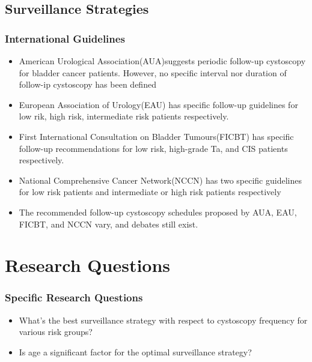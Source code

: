 \documentclass{beamer}
\begin{document}
\subsection{Surveillance Strategies}
\frame
{
\frametitle{International Guidelines }
  \begin{itemize}
  \item {American Urological Association(AUA)suggests periodic follow-up cystoscopy for bladder cancer patients. However, no specific interval nor duration of follow-ip cystoscopy has been defined}
  \item {European Association of Urology(EAU) has specific follow-up guidelines for low rik, high risk, intermediate risk patients respectively. }
  \item {First International Consultation on Bladder Tumours(FICBT) has specific follow-up recommendations for low risk, high-grade Ta, and CIS patients respectively.}
  \item {National Comprehensive Cancer Network(NCCN) has two specific guidelines for low risk patients and intermediate or high risk patients respectively}
  \item {The recommended follow-up cystoscopy schedules proposed by AUA, EAU, FICBT, and NCCN vary, and debates still exist.}
  \end{itemize}
}






\section{Research Questions}
\frame
{
  \frametitle{Specific Research Questions   }

  \begin{itemize}

  \item<1-> {What's the best surveillance strategy with respect to cystoscopy frequency for various risk groups?}
  \item<2-> {Is age a significant factor for the optimal surveillance strategy?}
  \end{itemize}
 
}
\end{document}
